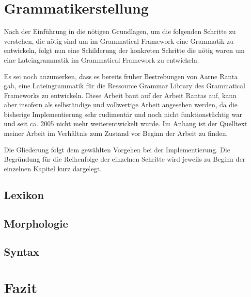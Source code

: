\documentclass[fontsize=12pt,abstract=on,titlepage,bibliography=totoc,ngerman,listof=totoc]{scrreprt}
\begin{document}
\chapter{Grammatikerstellung}
\label{chap:grammatik}
Nach der Einführung in die nötigen Grundlagen, um die folgenden Schritte zu verstehen, die nötig sind um im Grammatical Framework eine Grammatik zu entwickeln, folgt nun eine Schilderung der konkreten Schritte die nötig waren um eine Lateingrammatik im Grammatical Framework zu entwickeln. \par
Es sei noch anzumerken, dass es bereits früher Bestrebungen von Aarne Ranta gab, eine Lateingrammatik für die Ressource Grammar Library des Grammatical Frameworks zu entwickeln. Diese Arbeit baut auf der Arbeit Rantas auf, kann aber insofern als selbständige und vollwertige Arbeit angesehen werden, da die bisherige Implementierung sehr rudimentär und noch nicht funktionstüchtig war und seit ca. 2005 nicht mehr weiterentwickelt wurde. Im Anhang ist der Quelltext meiner Arbeit im Verhältnis zum Zustand vor Beginn der Arbeit zu finden. \par
Die Gliederung folgt dem gewählten Vorgehen bei der Implementierung. Die Begründung für die Reihenfolge der einzelnen Schritte wird jeweils zu Beginn der einzelnen Kapitel kurz dargelegt.
\pagebreak
\section{Lexikon}
\label{sec:lexikon}

\FloatBarrier
\pagebreak
\section{Morphologie}
\label{sec:morpho}

\FloatBarrier
\pagebreak
\section{Syntax}
\label{sec:syntax}

\FloatBarrier
\pagebreak
\chapter{Fazit}
\label{chap:fazit}

\FloatBarrier
\pagebreak
\clearpage
{}
\setcounter{page}{1}
%
\printbibliography
\pagebreak
\end{document}
